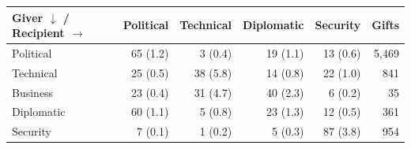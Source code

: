 \begin{tabular}{lrrrrr}
\toprule
Giver $\downarrow$ / Recipient $\rightarrow$ & Political & Technical & Diplomatic & Security & Gifts \\
\midrule
Political & 65 (1.2) & 3 (0.4) & 19 (1.1) & 13 (0.6) & 5,469 \\
Technical & 25 (0.5) & 38 (5.8) & 14 (0.8) & 22 (1.0) & 841 \\
Business & 23 (0.4) & 31 (4.7) & 40 (2.3) & 6 (0.2) & 35 \\
Diplomatic & 60 (1.1) & 5 (0.8) & 23 (1.3) & 12 (0.5) & 361 \\
Security & 7 (0.1) & 1 (0.2) & 5 (0.3) & 87 (3.8) & 954 \\
\bottomrule
\end{tabular}
